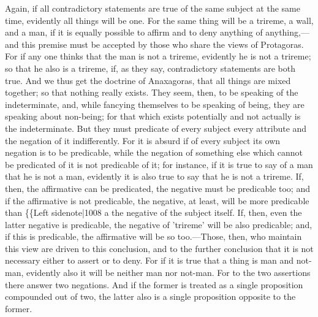 Again, if all contradictory statements are true of the same subject at the same time, evidently all things will be one. For the same thing will be a trireme, a wall, and a man, if it is equally possible to affirm and to deny anything of anything,—and this premise must be accepted by those who share the views of Protagoras. For if any one thinks that the man is not a trireme, evidently he is not a trireme; so that he also is a trireme, if, as they say, contradictory statements are both true. And we thus get the doctrine of Anaxagoras, that all things are mixed together; so that nothing really exists. They seem, then, to be speaking of the indeterminate, and, while fancying themselves to be speaking of being, they are speaking about non-being; for that which exists potentially and not actually is the indeterminate. But they must predicate of every subject every attribute and the negation of it indifferently. For it is absurd if of every subject its own negation is to be predicable, while the negation of something else which cannot be predicated of it is not predicable of it; for instance, if it is true to say of a man that he is not a man, evidently it is also true to say that he is not a trireme. If, then, the affirmative can be predicated, the negative must be predicable too; and if the affirmative is not predicable, the negative, at least, will be more predicable than \{\{Left sidenote|1008 a the negative of the subject itself. If, then, even the latter negative is predicable, the negative of 'trireme' will be also predicable; and, if this is predicable, the affirmative will be so too.—Those, then, who maintain this view are driven to this conclusion, and to the further conclusion that it is not necessary either to assert or to deny. For if it is true that a thing is man and not-man, evidently also it will be neither man nor not-man. For to the two assertions there answer two negations. And if the former is treated as a single proposition compounded out of two, the latter also is a single proposition opposite to the former.

